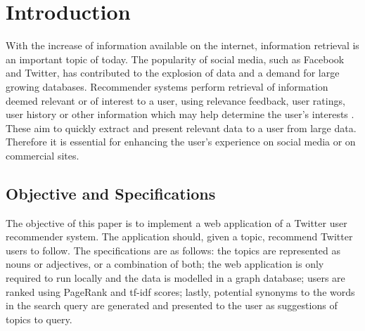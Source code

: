 \section{Introduction}
\label{sec:intro}

With the increase of information available on the internet, information
retrieval is an important topic of today. The popularity of social media, such
as Facebook and Twitter, has contributed to the explosion of data and a demand
for large growing databases. Recommender systems perform retrieval of
information deemed relevant or of interest to a user, using relevance feedback,
user ratings, user history or other information which may help determine the
user’s interests \citep{contBased}\cite{digLib}\cite{userRec}.  These aim to
quickly extract and present relevant data to a user from large data.  Therefore
it is essential for enhancing the user’s experience on social media or on
commercial sites.  

\subsection{Objective and Specifications}

The objective of this paper is to implement a web application of a Twitter user
recommender system. The application should, given a topic, recommend Twitter
users to follow. The specifications are as follows: the topics are represented
as nouns or adjectives, or a combination of both; the web application is only
required to run locally and the data is modelled in a graph database; users are
ranked using PageRank and tf-idf scores; lastly, potential synonyms to the words
in the search query are generated and presented to the user as suggestions of
topics to query.


